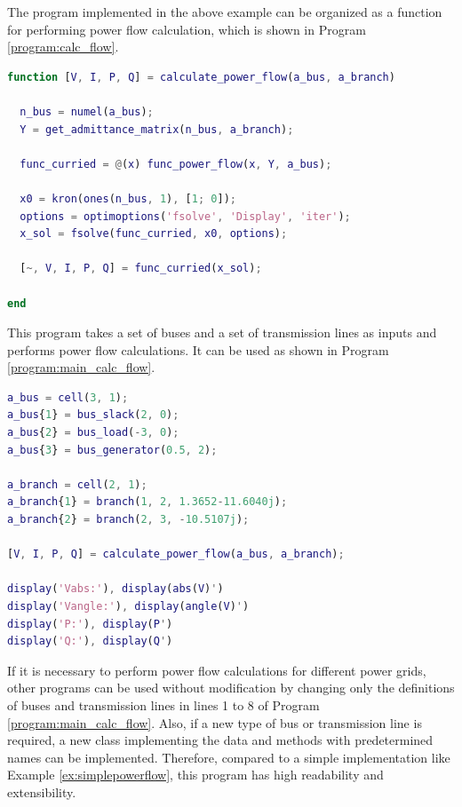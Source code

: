 \documentclass[graybox, envcountchap]{svmult}
\begin{document}
\begin{example}

The program implemented in the above example can be organized as a function for
performing power flow calculation, which is shown in Program
\ref{program:calc_flow}.

\begin{lstlisting}[language=Matlab, caption=calculate\_power\_flow.m, label={program:calc_flow}]
function [V, I, P, Q] = calculate_power_flow(a_bus, a_branch)

  n_bus = numel(a_bus);
  Y = get_admittance_matrix(n_bus, a_branch);

  func_curried = @(x) func_power_flow(x, Y, a_bus);

  x0 = kron(ones(n_bus, 1), [1; 0]);
  options = optimoptions('fsolve', 'Display', 'iter');
  x_sol = fsolve(func_curried, x0, options);

  [~, V, I, P, Q] = func_curried(x_sol);

end
\end{lstlisting}

This program takes a set of buses and a set of transmission lines as inputs and
performs power flow calculations. It can be used as shown in Program
\ref{program:main_calc_flow}.

\begin{lstlisting}[language=Matlab, caption=main\_power\_flow.m, label={program:main_calc_flow}]
a_bus = cell(3, 1);
a_bus{1} = bus_slack(2, 0);
a_bus{2} = bus_load(-3, 0);
a_bus{3} = bus_generator(0.5, 2);

a_branch = cell(2, 1);
a_branch{1} = branch(1, 2, 1.3652-11.6040j);
a_branch{2} = branch(2, 3, -10.5107j);

[V, I, P, Q] = calculate_power_flow(a_bus, a_branch);

display('Vabs:'), display(abs(V)')
display('Vangle:'), display(angle(V)')
display('P:'), display(P')
display('Q:'), display(Q')
\end{lstlisting}

If it is necessary to perform power flow calculations for different power grids,
other programs can be used without modification by changing only the definitions
of buses and transmission lines in lines 1 to 8 of Program
\ref{program:main_calc_flow}. Also, if a new type of bus or transmission line is
required, a new class implementing the data and methods with predetermined names
can be implemented. Therefore, compared to a simple implementation like Example
\ref{ex:simplepowerflow}, this program has high readability and extensibility.
\end{example}
\end{document}
